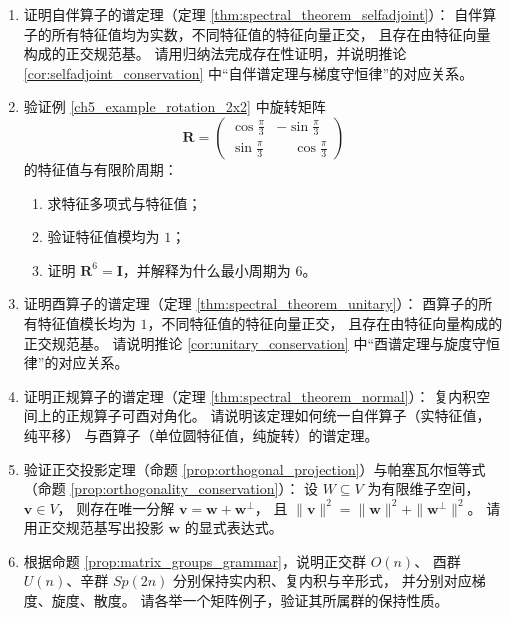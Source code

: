 \begin{enumerate}[leftmargin=3em, label=\textbf{题 \arabic*}]
    \item 证明自伴算子的谱定理（定理 \ref{thm:spectral_theorem_selfadjoint}）：
    自伴算子的所有特征值均为实数，不同特征值的特征向量正交，
    且存在由特征向量构成的正交规范基。
    请用归纳法完成存在性证明，并说明推论 \ref{cor:selfadjoint_conservation}
    中“自伴谱定理与梯度守恒律”的对应关系。

    \item 验证例 \ref{ch5_example_rotation_2x2} 中旋转矩阵
    \[
    \mathbf{R}=\begin{pmatrix}
    \cos\frac{\pi}{3}&-\sin\frac{\pi}{3}\\[2pt]
    \sin\frac{\pi}{3}&\phantom{-}\cos\frac{\pi}{3}
    \end{pmatrix}
    \]
    的特征值与有限阶周期：
    \begin{enumerate}[label=(\roman*)]
        \item 求特征多项式与特征值；
        \item 验证特征值模均为 $1$；
        \item 证明 $\mathbf{R}^6=\mathbf{I}$，并解释为什么最小周期为 $6$。
    \end{enumerate}

    \item 证明酉算子的谱定理（定理 \ref{thm:spectral_theorem_unitary}）：
    酉算子的所有特征值模长均为 $1$，不同特征值的特征向量正交，
    且存在由特征向量构成的正交规范基。
    请说明推论 \ref{cor:unitary_conservation}
    中“酉谱定理与旋度守恒律”的对应关系。

    \item 证明正规算子的谱定理（定理 \ref{thm:spectral_theorem_normal}）：
    复内积空间上的正规算子可酉对角化。
    请说明该定理如何统一自伴算子（实特征值，纯平移）
    与酉算子（单位圆特征值，纯旋转）的谱定理。

    \item 验证正交投影定理（命题 \ref{prop:orthogonal_projection}）与帕塞瓦尔恒等式
    （命题 \ref{prop:orthogonality_conservation}）：
    设 $W\subseteq V$ 为有限维子空间，$\mathbf{v}\in V$，
    则存在唯一分解 $\mathbf{v}=\mathbf{w}+\mathbf{w}^\perp$，
    且 $\|\mathbf{v}\|^2=\|\mathbf{w}\|^2+\|\mathbf{w}^\perp\|^2$。
    请用正交规范基写出投影 $\mathbf{w}$ 的显式表达式。

    \item 根据命题 \ref{prop:matrix_groups_grammar}，说明正交群 $O(n)$、
    酉群 $U(n)$、辛群 $Sp(2n)$ 分别保持实内积、复内积与辛形式，
    并分别对应梯度、旋度、散度。
    请各举一个矩阵例子，验证其所属群的保持性质。


\end{enumerate}
